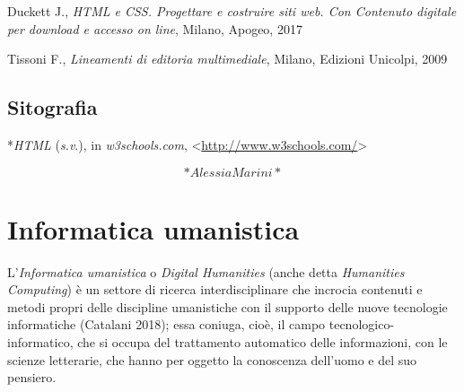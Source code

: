 \documentclass[
  b5paper,
  twoside,
  11pt,
  chapterprefix=false,
  bibliography=totocnumbered,
  listof=flat]{scrbook}
\begin{document}
Duckett J., \emph{HTML e CSS. Progettare e costruire siti web. Con Contenuto
digitale per download e accesso on line}, Milano, Apogeo, 2017

Tissoni F., \emph{Lineamenti di editoria multimediale}, Milano, Edizioni
Unicolpi, 2009

\hypertarget{sitografia-15}{%
\section*{Sitografia}\label{sitografia-15}}

*\emph{HTML} (\emph{s.v}.), in \emph{w3schools.com},
\textless{}\href{http://www.w3schools.com/}{{http://www.w3schools.com/}}\textgreater{}

\[*Alessia Marini*\]

\hypertarget{informatica-umanistica}{%
\chapter{Informatica umanistica}\label{informatica-umanistica}}

L'\emph{Informatica umanistica} o \emph{Digital Humanities} (anche detta
\emph{Humanities Computing}) è un settore di ricerca interdisciplinare che
incrocia contenuti e metodi propri delle discipline umanistiche con il
supporto delle nuove tecnologie informatiche (Catalani 2018); essa
coniuga, cioè, il campo tecnologico-informatico, che si occupa del
trattamento automatico delle informazioni, con le scienze letterarie,
che hanno per oggetto la conoscenza dell'uomo e del suo pensiero.
\end{document}

